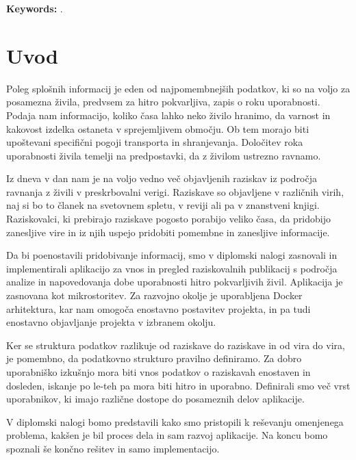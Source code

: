 \noindent\textbf{Keywords:} \tkeywordsEn.
\clearemptydoublepage

\mainmatter
\setcounter{page}{1}
\pagestyle{fancy}


\chapter{Uvod}

Poleg splošnih informacij je eden od najpomembnejših podatkov, ki so na voljo za posamezna živila, predvsem za hitro pokvarljiva, zapis o roku uporabnosti. Podaja nam informacijo, koliko časa lahko neko živilo hranimo, da varnost in kakovost izdelka ostaneta v sprejemljivem območju. Ob tem morajo biti upoštevani specifični pogoji transporta in shranjevanja. Določitev roka uporabnosti živila temelji na predpostavki, da z živilom ustrezno ravnamo.

Iz dneva v dan nam je na voljo vedno več objavljenih raziskav iz področja ravnanja z živili v preskrbovalni verigi. Raziskave so objavljene v različnih virih, naj si bo to članek na svetovnem spletu, v reviji ali pa v znanstveni knjigi. Raziskovalci, ki prebirajo raziskave pogosto porabijo veliko časa, da pridobijo zanesljive vire in iz njih uspejo pridobiti pomembne in zanesljive informacije.

Da bi poenostavili pridobivanje informacij, smo v diplomski nalogi zasnovali in implementirali aplikacijo za vnos in pregled raziskovalnih publikacij s področja analize in napovedovanja dobe uporabnosti hitro pokvarljivih živil. Aplikacija je zasnovana kot mikrostoritev. Za razvojno okolje je uporabljena Docker arhitektura, kar nam omogoča enostavno postavitev projekta, in pa tudi enostavno objavljanje projekta v izbranem okolju.

Ker se struktura podatkov razlikuje od raziskave do raziskave in od vira do vira, je pomembno, da podatkovno strukturo pravilno definiramo. Za dobro uporabniško izkušnjo mora biti vnos podatkov o raziskavah enostaven in dosleden, iskanje po le-teh pa mora biti hitro in uporabno. Definirali smo več vrst uporabnikov, ki imajo različne dostope do posameznih delov aplikacije.

V diplomski nalogi bomo predstavili kako smo pristopili k reševanju omenjenega problema, kakšen je bil proces dela in sam razvoj aplikacije. Na koncu bomo spoznali še končno rešitev in samo implementacijo.




